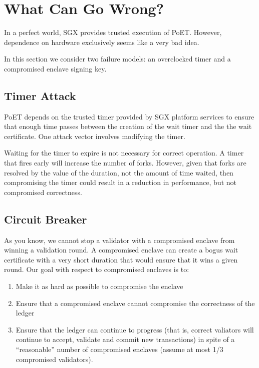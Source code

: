 
\section{What Can Go Wrong?}
\label{sec_failure}

In a perfect world, SGX provides trusted execution of PoET. However, dependence on hardware exclusively seems like a
very bad idea. 

In this section we consider two failure models: an overclocked timer and a compromised enclave signing key. 

\subsection{Timer Attack}

PoET depends on the trusted timer provided by SGX platform services to ensure that enough time passes between the
creation of the wait timer and the the wait certificate. One attack vector involves modifying the timer. 

Waiting for the timer to expire is not necessary for correct operation. A timer that fires early will increase the
number of forks. However, given that forks are resolved by the value of the duration, not the amount of time waited,
then compromising the timer could result in a reduction in performance, but not compromised correctness.

\subsection{Circuit Breaker}

As you know, we cannot stop a validator with a compromised enclave from
winning a validation round. A compromised enclave can create a bogus
wait certificate with a very short duration that would ensure that it
wins a given round. Our goal with respect to compromised enclaves is to:

\begin{enumerate}
\item Make it as hard as possible to compromise the enclave
\item Ensure that a compromised enclave cannot compromise the
  correctness of the ledger
\item Ensure that the ledger can continue to progress (that is, correct
  valiators will continue to accept, validate and commit new
  transactions) in spite of a ``reasonable'' number of compromised enclaves
  (assume at most 1/3 compromised validators).
\end{enumerate}

